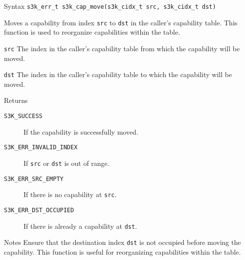 \documentclass[a4paper,11pt]{article}
\newcommand{\syscall}[1]{\texttt{#1}}
\newenvironment{syscalldoc}[1]{
  \begin{tcolorbox}[breakable,title=\subsection{\syscall{#1}}]
  \begin{description}[leftmargin=!,style=nextline,noitemsep]
}{
  \end{description}
  \end{tcolorbox}
}
\begin{document}
\begin{syscalldoc}{s3k\_cap\_move}
  \item[Syntax] \lstinline{s3k_err_t s3k_cap_move(s3k_cidx_t src, s3k_cidx_t dst)}

  \item[Description] Moves a capability from index \verb|src| to \verb|dst| in the caller's capability table. This function is used to reorganize capabilities within the table.

  \item[Parameters]
    \begin{description}
      \item[]
      \item[\texttt{src}] The index in the caller's capability table from which the capability will be moved.
      \item[\texttt{dst}] The index in the caller's capability table to which the capability will be moved.
    \end{description}

  \item[Returns]
    \begin{description}
      \item[]
      \item[\texttt{S3K\_SUCCESS}] If the capability is successfully moved.
      \item[\texttt{S3K\_ERR\_INVALID\_INDEX}] If \verb|src| or \verb|dst| is out of range.
      \item[\texttt{S3K\_ERR\_SRC\_EMPTY}] If there is no capability at \verb|src|.
      \item[\texttt{S3K\_ERR\_DST\_OCCUPIED}] If there is already a capability at \verb|dst|.
    \end{description}

  \item[Notes] Ensure that the destination index \verb|dst| is not occupied before moving the capability. This function is useful for reorganizing capabilities within the table.
\end{syscalldoc}
\end{document}
